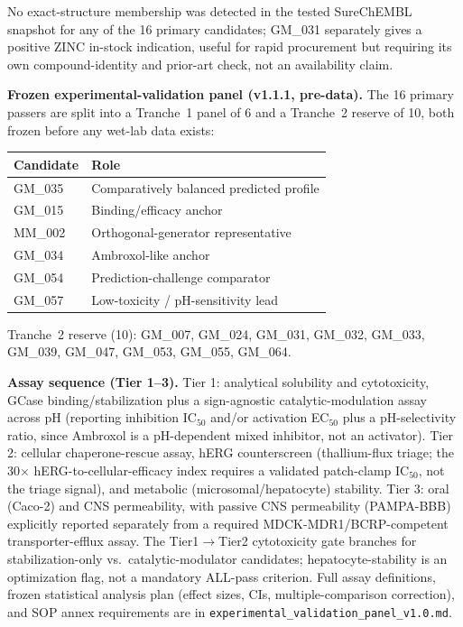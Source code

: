 \documentclass{article}
\begin{document}
No exact-structure membership was detected in the tested SureChEMBL snapshot for any of the 16 primary candidates; GM\_031 separately gives a positive ZINC in-stock indication, useful for rapid procurement but requiring its own compound-identity and prior-art check, not an availability claim.

\textbf{Frozen experimental-validation panel (v1.1.1, pre-data).} The 16 primary passers are split into a Tranche~1 panel of 6 and a Tranche~2 reserve of 10, both frozen before any wet-lab data exists:

\begin{table}[H]
\centering
\footnotesize
\begin{tabular}{ll}
\toprule
Candidate & Role \\
\midrule
GM\_035 & Comparatively balanced predicted profile \\
GM\_015 & Binding/efficacy anchor \\
MM\_002 & Orthogonal-generator representative \\
GM\_034 & Ambroxol-like anchor \\
GM\_054 & Prediction-challenge comparator \\
GM\_057 & Low-toxicity / pH-sensitivity lead \\
\bottomrule
\end{tabular}
\end{table}

Tranche~2 reserve (10): GM\_007, GM\_024, GM\_031, GM\_032, GM\_033, GM\_039, GM\_047, GM\_053, GM\_055, GM\_064.

\textbf{Assay sequence (Tier 1--3).} Tier 1: analytical solubility and cytotoxicity, GCase binding/stabilization plus a sign-agnostic catalytic-modulation assay across pH (reporting inhibition IC$_{50}$ and/or activation EC$_{50}$ plus a pH-selectivity ratio, since Ambroxol is a pH-dependent mixed inhibitor, not an activator). Tier 2: cellular chaperone-rescue assay, hERG counterscreen (thallium-flux triage; the 30$\times$ hERG-to-cellular-efficacy index requires a validated patch-clamp IC$_{50}$, not the triage signal), and metabolic (microsomal/hepatocyte) stability. Tier 3: oral (Caco-2) and CNS permeability, with passive CNS permeability (PAMPA-BBB) explicitly reported separately from a required MDCK-MDR1/BCRP-competent transporter-efflux assay. The Tier1$\to$Tier2 cytotoxicity gate branches for stabilization-only vs.\ catalytic-modulator candidates; hepatocyte-stability is an optimization flag, not a mandatory ALL-pass criterion. Full assay definitions, frozen statistical analysis plan (effect sizes, CIs, multiple-comparison correction), and SOP annex requirements are in \texttt{experimental\_validation\_panel\_v1.0.md}.
\end{document}
